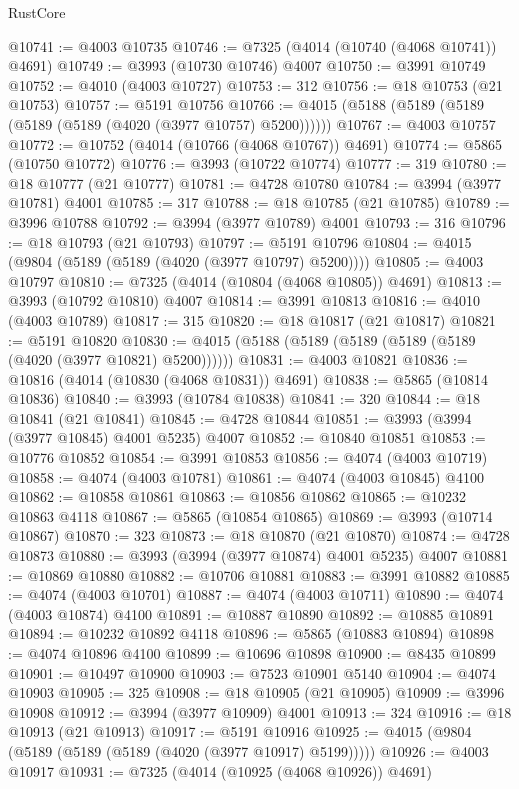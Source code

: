 \begin{lexlean}{RustCore}
\begin{coremodule}
@10741 := @4003 @10735
@10746 := @7325 (@4014 (@10740 (@4068 @10741)) @4691)
@10749 := @3993 (@10730 @10746) @4007
@10750 := @3991 @10749
@10752 := @4010 (@4003 @10727)
@10753 := 312
@10756 := @18 @10753 (@21 @10753)
@10757 := @5191 @10756
@10766 := @4015 (@5188 (@5189 (@5189 (@5189 (@5189 (@4020 (@3977 @10757) @5200))))))
@10767 := @4003 @10757
@10772 := @10752 (@4014 (@10766 (@4068 @10767)) @4691)
@10774 := @5865 (@10750 @10772)
@10776 := @3993 (@10722 @10774)
@10777 := 319
@10780 := @18 @10777 (@21 @10777)
@10781 := @4728 @10780
@10784 := @3994 (@3977 @10781) @4001
@10785 := 317
@10788 := @18 @10785 (@21 @10785)
@10789 := @3996 @10788
@10792 := @3994 (@3977 @10789) @4001
@10793 := 316
@10796 := @18 @10793 (@21 @10793)
@10797 := @5191 @10796
@10804 := @4015 (@9804 (@5189 (@5189 (@4020 (@3977 @10797) @5200))))
@10805 := @4003 @10797
@10810 := @7325 (@4014 (@10804 (@4068 @10805)) @4691)
@10813 := @3993 (@10792 @10810) @4007
@10814 := @3991 @10813
@10816 := @4010 (@4003 @10789)
@10817 := 315
@10820 := @18 @10817 (@21 @10817)
@10821 := @5191 @10820
@10830 := @4015 (@5188 (@5189 (@5189 (@5189 (@5189 (@4020 (@3977 @10821) @5200))))))
@10831 := @4003 @10821
@10836 := @10816 (@4014 (@10830 (@4068 @10831)) @4691)
@10838 := @5865 (@10814 @10836)
@10840 := @3993 (@10784 @10838)
@10841 := 320
@10844 := @18 @10841 (@21 @10841)
@10845 := @4728 @10844
@10851 := @3993 (@3994 (@3977 @10845) @4001 @5235) @4007
@10852 := @10840 @10851
@10853 := @10776 @10852
@10854 := @3991 @10853
@10856 := @4074 (@4003 @10719)
@10858 := @4074 (@4003 @10781)
@10861 := @4074 (@4003 @10845) @4100
@10862 := @10858 @10861
@10863 := @10856 @10862
@10865 := @10232 @10863 @4118
@10867 := @5865 (@10854 @10865)
@10869 := @3993 (@10714 @10867)
@10870 := 323
@10873 := @18 @10870 (@21 @10870)
@10874 := @4728 @10873
@10880 := @3993 (@3994 (@3977 @10874) @4001 @5235) @4007
@10881 := @10869 @10880
@10882 := @10706 @10881
@10883 := @3991 @10882
@10885 := @4074 (@4003 @10701)
@10887 := @4074 (@4003 @10711)
@10890 := @4074 (@4003 @10874) @4100
@10891 := @10887 @10890
@10892 := @10885 @10891
@10894 := @10232 @10892 @4118
@10896 := @5865 (@10883 @10894)
@10898 := @4074 @10896 @4100
@10899 := @10696 @10898
@10900 := @8435 @10899
@10901 := @10497 @10900
@10903 := @7523 @10901 @5140
@10904 := @4074 @10903
@10905 := 325
@10908 := @18 @10905 (@21 @10905)
@10909 := @3996 @10908
@10912 := @3994 (@3977 @10909) @4001
@10913 := 324
@10916 := @18 @10913 (@21 @10913)
@10917 := @5191 @10916
@10925 := @4015 (@9804 (@5189 (@5189 (@5189 (@4020 (@3977 @10917) @5199)))))
@10926 := @4003 @10917
@10931 := @7325 (@4014 (@10925 (@4068 @10926)) @4691)

\end{coremodule}
\end{lexlean}
